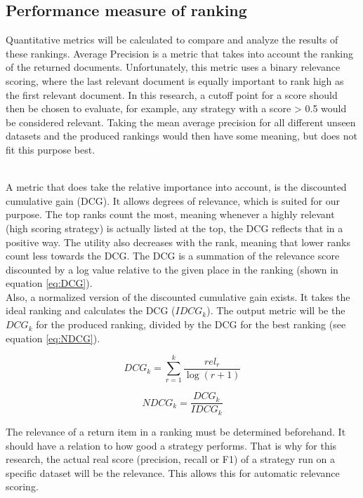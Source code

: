 \subsection{Performance measure of ranking}
Quantitative metrics will be calculated to compare and analyze the results of these rankings.
Average Precision is a metric that takes into account the ranking of the returned documents. Unfortunately, this metric uses a binary relevance scoring, where the last relevant document is equally important to rank high as the first relevant document. In this research, a cutoff point for a score should then be chosen to evaluate, for example, any strategy with a score > 0.5 would be considered relevant. Taking the mean average precision for all different unseen datasets and the produced rankings would then have some meaning, but does not fit this purpose best.

~\\A metric that does take the relative importance into account, is the discounted cumulative gain (DCG). It allows degrees of relevance, which is suited for our purpose. The top ranks count the most, meaning whenever a highly relevant (high scoring strategy) is actually listed at the top, the DCG reflects that in a positive way. The utility also decreases with the rank, meaning that lower ranks count less towards the DCG. The DCG is a summation of the relevance score discounted by a log value relative to the given place in the ranking (shown in equation \ref{eq:DCG}).
~\\Also, a normalized version of the discounted cumulative gain exists. It takes the ideal ranking and calculates the DCG ($IDCG_k$). The output metric will be the $DCG_k$ for the produced ranking, divided by the DCG for the best ranking (see equation \ref{eq:NDCG}). 

\begin{equation}
\label{eq:DCG}
    DCG_k = \sum^k_{r=1} \frac{rel_r}{\log(r+1)}
\end{equation}

\begin{equation}
\label{eq:NDCG}
    NDCG_k = \frac{DCG_k}{IDCG_k}
\end{equation}

The relevance of a return item in a ranking must be determined beforehand. It should have a relation to how good a strategy performs. 
That is why for this research, the actual real score (precision, recall or F1) of a strategy run on a specific dataset will be the relevance. This allows this for automatic relevance scoring.

